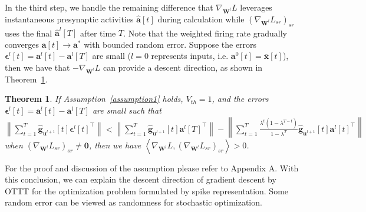 \documentclass{article}
\begin{document}
In the third step, we handle the remaining difference that $\nabla_{\mathbf{W}^l}L$ leverages instantaneous presynaptic activities $\hat{\mathbf{a}}[t]$ during calculation while $\left(\nabla_{\mathbf{W}^l}L_{sr}\right)_{sr}$ uses the final $\hat{\mathbf{a}}^l[T]$ after time $T$. Note that the weighted firing rate gradually converges $\mathbf{a}[t]\rightarrow \mathbf{a}^*$ with bounded random error. Suppose the errors $\bm{\epsilon}^l[t]=\mathbf{a}^l[t]-\mathbf{a}^l[T]$ are small ($l=0$ represents inputs, i.e. $\mathbf{a}^0[t]=\overline{\mathbf{x}}[t]$), then we have that $-\nabla_{\mathbf{W}^l}L$ can provide a descent direction, as shown in Theorem~\ref{thm_feedforward}. 
\newtheorem{thm}{\bf Theorem}
\begin{thm}\label{thm_feedforward}
If Assumption~\ref{assumption1} holds, $V_{th}=1$, and the errors $\bm{\epsilon}^l[t]=\mathbf{a}^l[t]-\mathbf{a}^l[T]$ are small such that $\left\lVert \sum_{t=1}^T \hat{\mathbf{g}}_{\mathbf{u}^{l+1}}[t] {\bm{\epsilon}^l[t]}^\top \right\rVert < \left\lVert \sum_{t=1}^T \hat{\mathbf{g}}_{\mathbf{u}^{l+1}}[t] {\mathbf{a}^l[T]}^\top \right\rVert - \left\lVert \sum_{t=1}^T \frac{\lambda^t(1-\lambda^{T-t})}{1-\lambda^T}\hat{\mathbf{g}}_{\mathbf{u}^{l+1}}[t] {\mathbf{a}^l[t]}^\top \right\rVert$ when $\left(\nabla_{\mathbf{W}^l}L_{sr}\right)_{sr}\neq\mathbf{0}$, then we have $\left<\nabla_{\mathbf{W}^l}L, \left(\nabla_{\mathbf{W}^l}L_{sr}\right)_{sr}\right> > 0$.
\end{thm}
For the proof and discussion of the assumption please refer to Appendix A. 
With this conclusion, we can explain the descent direction of gradient descent by OTTT for the optimization problem formulated by spike representation. Some random error can be viewed as randomness for stochastic optimization.
\end{document}
